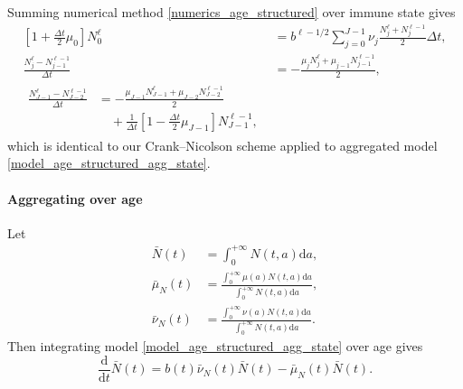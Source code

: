 \documentclass[USenglish]{article}
\newcommand{\md}{\mathrm{d}}
\begin{document}
Summing numerical method \eqref{numerics_age_structured} over immune
state gives
\begin{subequations}
  \label{numerics_age_structured_agg_state}
  \begin{align}
    \left[1 + \frac{\Delta t}{2} \mu_0\right] N_0^{\ell}
    &= b^{\ell - 1 / 2}
    \sum_{j = 0}^{J - 1} \nu_j \frac{N_j^{\ell} + N_j^{\ell - 1}}{2} \Delta t,
    \\
    \frac{N_j^{\ell} - N_{j - 1}^{\ell - 1}}{\Delta t}
    &= - \frac{\mu_j N_j^{\ell} + \mu_{j - 1} N_{j - 1}^{\ell - 1}}{2},
    \\
    \begin{split}
      \frac{N_{J - 1}^{\ell} - N_{J - 2}^{\ell - 1}}{\Delta t}
      &= - \frac{\mu_{J - 1} N_{J - 1}^{\ell} + \mu_{J - 2} N_{J - 2}^{\ell - 1}}{2}
      \\ & \quad {}
      + \frac{1}{\Delta t} \left[
        1 - \frac{\Delta t}{2} \mu_{J - 1}
      \right] N_{J - 1}^{\ell - 1},
    \end{split}
  \end{align}
\end{subequations}
which is identical to our Crank--Nicolson scheme applied to aggregated
model \eqref{model_age_structured_agg_state}.


\paragraph{Aggregating over age}

Let
\begin{subequations}
  \begin{align}
    \bar{N}(t)
    &= \int_0^{+\infty} N(t, a) \md a,
    \\
    \bar{\mu}_N(t)
    &= \frac{\int_0^{+\infty} \mu(a) N(t, a) \md a}
    {\int_0^{+\infty} N(t, a) \md a},
    \\
    \bar{\nu}_N(t)
    &= \frac{\int_0^{+\infty} \nu(a) N(t, a) \md a}
    {\int_0^{+\infty} N(t, a) \md a}.
  \end{align}
\end{subequations}
Then integrating model \eqref{model_age_structured_agg_state} over age
gives
\begin{equation}
  \label{model_age_structured_agg_state_age}
  \frac{\md}{\md t} \bar{N}(t)
  = b(t) \bar{\nu}_N(t) \bar{N}(t)
  - \bar{\mu}_N(t) \bar{N}(t).
\end{equation}
\end{document}

